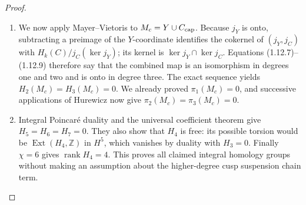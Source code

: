 \documentclass[11pt,a4paper]{article}
\theoremstyle{definition}
\begin{document}
\begin{proof}
\begin{enumerate}[label=\arabic*.]
\item We now apply Mayer--Vietoris to $M_c=Y\cup C_{\rm cap}$.
Because $j_Y$ is onto, subtracting a preimage of the $Y$-coordinate
identifies the cokernel of $(j_Y,j_C)$ with
$H_k(C)/j_C(\ker j_Y)$; its kernel is
$\ker j_Y\cap\ker j_C$.
Equations (1.12.7)--(1.12.9) therefore say that the combined map is an
isomorphism in degrees one and two and is onto in degree three.
The exact sequence yields $H_2(M_c)=H_3(M_c)=0$.
We already proved $\pi_1(M_c)=0$, and successive applications of
Hurewicz now give $\pi_2(M_c)=\pi_3(M_c)=0$.

\item Integral Poincar\'e duality and the universal coefficient theorem
give $H_5=H_6=H_7=0$.  They also show that $H_4$ is free: its possible
torsion would be $\operatorname{Ext}(H_4,\mathbb Z)$ in $H^5$, which
vanishes by duality with $H_3=0$.
Finally $\chi=6$ gives $\operatorname{rank}H_4=4$.
This proves all claimed integral homology groups without making an
assumption about the higher-degree cusp suspension chain term.

\end{enumerate}
\end{proof}
\end{document}
